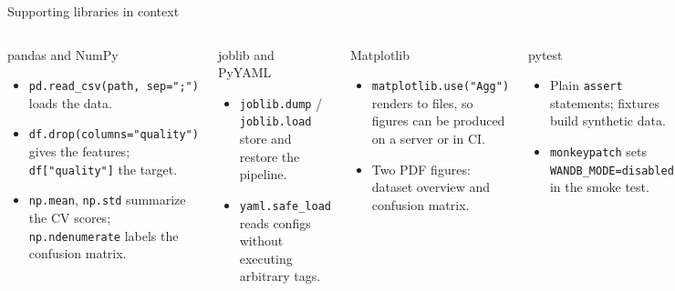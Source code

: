 \begin{frame}{Supporting libraries in context}
\begin{columns}[T]
\begin{block}{pandas and NumPy}
\footnotesize
\begin{itemize}\setlength{\itemsep}{1pt}
\item \texttt{pd.read\_csv(path, sep=";")} loads the data.
\item \texttt{df.drop(columns="quality")} gives the features; \texttt{df["quality"]} the target.
\item \texttt{np.mean}, \texttt{np.std} summarize the CV scores; \texttt{np.ndenumerate} labels the confusion matrix.
\end{itemize}
\end{block}
\begin{block}{joblib and PyYAML}
\footnotesize
\begin{itemize}\setlength{\itemsep}{1pt}
\item \texttt{joblib.dump} / \texttt{joblib.load} store and restore the pipeline.
\item \texttt{yaml.safe\_load} reads configs without executing arbitrary tags.
\end{itemize}
\end{block}
\begin{block}{Matplotlib}
\footnotesize
\begin{itemize}\setlength{\itemsep}{1pt}
\item \texttt{matplotlib.use("Agg")} renders to files, so figures can be produced on a server or in CI.
\item Two PDF figures: dataset overview and confusion matrix.
\end{itemize}
\end{block}
\begin{block}{pytest}
\footnotesize
\begin{itemize}\setlength{\itemsep}{1pt}
\item Plain \texttt{assert} statements; fixtures build synthetic data.
\item \texttt{monkeypatch} sets \texttt{WANDB\_MODE=disabled} in the smoke test.
\end{itemize}
\end{block}
\end{columns}
\coursefooter
\end{frame}


